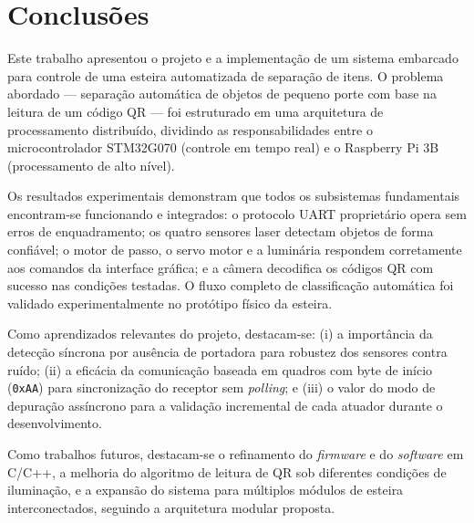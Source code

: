 \section{Conclusões}\label{sec:conclusoes}

Este trabalho apresentou o projeto e a implementação de um sistema embarcado para controle de uma esteira automatizada de separação de itens. O problema abordado — separação automática de objetos de pequeno porte com base na leitura de um código QR — foi estruturado em uma arquitetura de processamento distribuído, dividindo as responsabilidades entre o microcontrolador STM32G070 (controle em tempo real) e o Raspberry Pi 3B (processamento de alto nível).

Os resultados experimentais demonstram que todos os subsistemas fundamentais encontram-se funcionando e integrados: o protocolo UART proprietário opera sem erros de enquadramento; os quatro sensores laser detectam objetos de forma confiável; o motor de passo, o servo motor e a luminária respondem corretamente aos comandos da interface gráfica; e a câmera decodifica os códigos QR com sucesso nas condições testadas. O fluxo completo de classificação automática foi validado experimentalmente no protótipo físico da esteira.

Como aprendizados relevantes do projeto, destacam-se: (i) a importância da detecção síncrona por ausência de portadora para robustez dos sensores contra ruído; (ii) a eficácia da comunicação baseada em quadros com byte de início (\texttt{0xAA}) para sincronização do receptor sem \textit{polling}; e (iii) o valor do modo de depuração assíncrono para a validação incremental de cada atuador durante o desenvolvimento.

Como trabalhos futuros, destacam-se o refinamento do \textit{firmware} e do \textit{software} em C/C++, a melhoria do algoritmo de leitura de QR sob diferentes condições de iluminação, e a expansão do sistema para múltiplos módulos de esteira interconectados, seguindo a arquitetura modular proposta.
